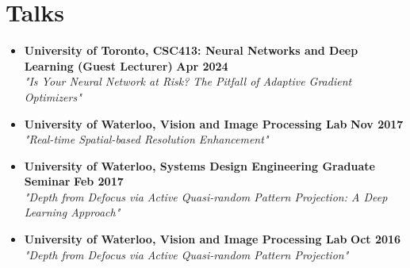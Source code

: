 \section*{Talks}
\vspace{\postsubhead}
\begin{adjustwidth}{\indentleft}{\indentright}
  \begin{itemize}
    
    
    
    \item \textbf{University of Toronto, CSC413: Neural Networks and Deep Learning (Guest Lecturer)}
    \hfill
    \textbf{Apr 2024}\\
    \textit{"Is Your Neural Network at Risk? The Pitfall of Adaptive Gradient Optimizers"}
    \vspace{\interlist}
    
    \item \textbf{University of Waterloo, Vision and Image Processing Lab}
    \hfill
    \textbf{Nov 2017}\\
    \textit{"Real-time Spatial-based Resolution Enhancement"}
    \vspace{\interlist}
    
    
    
    \item \textbf{University of Waterloo, Systems Design Engineering Graduate Seminar}
    \hfill
    \textbf{Feb 2017}\\
    \textit{"Depth from Defocus via Active Quasi-random Pattern Projection: A Deep Learning Approach"}
    \vspace{\interlist}
    
    \item \textbf{University of Waterloo, Vision and Image Processing Lab}
    \hfill
    \textbf{Oct 2016}\\
    \textit{"Depth from Defocus via Active Quasi-random Pattern Projection"}
    \vspace{\interlist}
    
  \end{itemize}
\end{adjustwidth}
